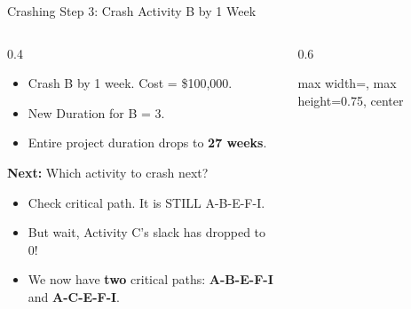 \documentclass[11pt,aspectratio=169]{beamer}
\begin{document}
\begin{frame}{Crashing Step 3: Crash Activity B by 1 Week}
    \begin{columns}[T]
    \begin{column}{0.4\textwidth}
        \small
        \begin{itemize}
            \item Crash B by 1 week. Cost = \$100,000.
            \item New Duration for B = 3.
            \item Entire project duration drops to \textbf{27 weeks}.
        \end{itemize}
        \vspace{1em}
        \textbf{Next:} Which activity to crash next?
        \begin{itemize}
            \item Check critical path. It is STILL A-B-E-F-I.
            \item But wait, Activity C's slack has dropped to 0!
            \item We now have \textbf{two} critical paths: \textbf{A-B-E-F-I} and \textbf{A-C-E-F-I}.
        \end{itemize}
    \end{column}
    \begin{column}{0.6\textwidth}
        \begin{adjustbox}{max width=\linewidth, max height=0.75\textheight, center}
\end{adjustbox}
\end{column}
\end{columns}
\end{frame}
\end{document}
